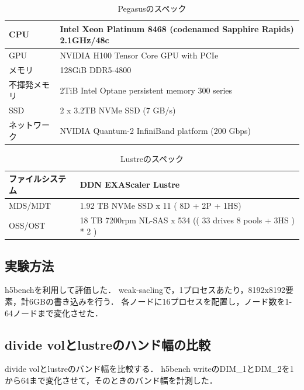 \documentclass[submit,techrep,noauthor]{ipsj}
\begin{document}
\begin{table}[t]
	\caption{Pegasusのスペック}
	\label{tab:pegasus}
	\centering
	
	\begin{tabularx}{\linewidth}{Y|Y}
		\hline \hline
		CPU    & Intel Xeon Platinum 8468 (codenamed Sapphire Rapids) 2.1GHz/48c \\ \hline
		GPU    & NVIDIA H100 Tensor Core GPU with PCIe                           \\ \hline
		メモリ    & 128GiB DDR5-4800                                                \\ \hline
		不揮発メモリ & 2TiB Intel Optane persistent memory 300 series                  \\ \hline
		SSD    & 2 x 3.2TB NVMe SSD (7 GB/s)                                     \\ \hline
		ネットワーク & NVIDIA Quantum-2 InfiniBand platform (200 Gbps)                 \\ \hline
	\end{tabularx}
\end{table}

\begin{table}[t]
	\caption{Lustreのスペック}
	\label{tab:lustre}
	\centering
	
	\begin{tabularx}{\linewidth}{Y||Y}
		\hline \hline
		ファイルシステム & DDN EXAScaler Lustre                                          \\ \hline
		MDS/MDT  & 1.92 TB NVMe SSD x 11 ( 8D + 2P + 1HS)                        \\ \hline
		OSS/OST  & 18 TB 7200rpm NL-SAS x 534 (( 33 drives 8 pools + 3HS ) * 2 ) \\ \hline
	\end{tabularx}
\end{table}

\subsection{実験方法}
h5bench\cite{h5bench}を利用して評価した．
weak-saclingで，1プロセスあたり，8192x8192要素，計6GBの書き込みを行う．
各ノードに16プロセスを配置し，ノード数を1-64ノードまで変化させた．

\subsection{divide volとlustreのハンド幅の比較}
divide volとlustreのバンド幅を比較する．
h5bench writeのDIM\_1とDIM\_2を1から64まで変化させて，そのときのバンド幅を計測した．
\end{document}
